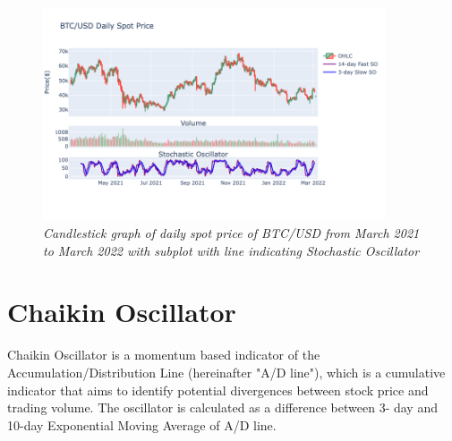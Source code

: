 \begin{figure}[ht]

\begin{center}
	\includegraphics[width=0.9\textwidth]{Figs/Stochastic.png}
\end{center}

\caption{\textit{ Candlestick graph of daily spot price of BTC/USD from March 2021 to March 2022 with subplot with line indicating Stochastic Oscillator}}

\end{figure}

\newpage

\section{Chaikin Oscillator}

Chaikin Oscillator is a momentum based indicator of the Accumulation/Distribution Line (hereinafter "A/D line"), which is a cumulative indicator that aims to identify potential divergences between stock price and trading volume. The oscillator is calculated as a difference between 3- day and 10-day Exponential Moving Average of A/D line. 

\vspace{0.5cm}

